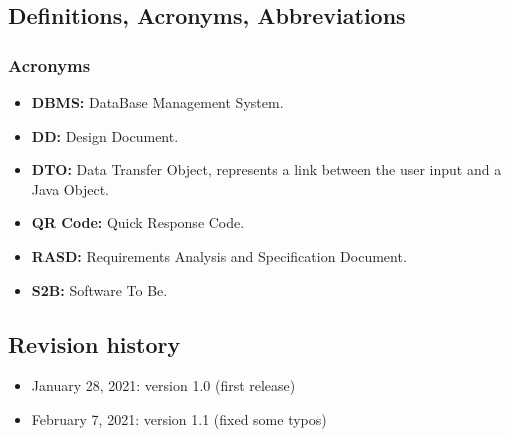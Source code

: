 \documentclass[table, 12pt]{article}
\begin{document}
\subsection{Definitions, Acronyms, Abbreviations}
\subsubsection{Acronyms}
\begin{itemize}
    \item \textbf{DBMS:} DataBase Management System.
    \item \textbf{DD:} Design Document.
    \item \textbf{DTO:} Data Transfer Object, represents a link between the user input and a Java Object.
    \item \textbf{QR Code:} Quick Response Code.
    \item \textbf{RASD:} Requirements Analysis and Specification Document.
    \item \textbf{S2B:} Software To Be.
\end{itemize}

\subsection{Revision history}
\begin{itemize}
    \item January 28, 2021: version 1.0 (first release)
    \item February 7, 2021: version 1.1 (fixed some typos)
\end{itemize}
\end{document}
